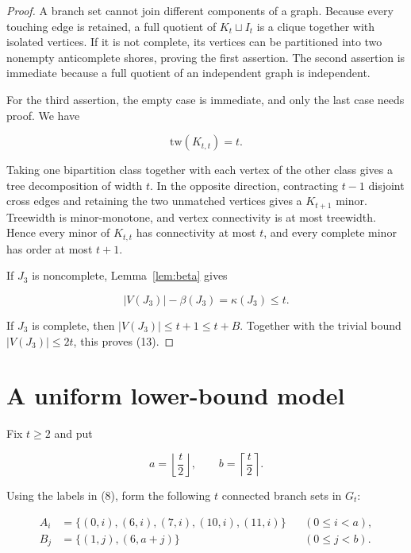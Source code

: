 \documentclass[11pt]{article}
\begin{document}
\begin{proof}

A branch set cannot join different components of a graph. Because every
touching edge is retained, a full quotient of $K_t\sqcup I_t$ is a clique
together with isolated vertices. If it is not complete, its vertices can be
partitioned into two nonempty anticomplete shores, proving the first assertion.
The second assertion is immediate because a full quotient of an independent
graph is independent.

For the third assertion, the empty case is immediate, and only the last case
needs proof. We have

\nopagebreak[4]
\[
\mathrm{tw}(K_{t,t})=t.                                    \tag{14}
\]

Taking one bipartition class together with each vertex of the other class
gives a tree decomposition of width $t$. In the opposite direction,
contracting $t-1$ disjoint cross edges and retaining the two unmatched
vertices gives a $K_{t+1}$ minor. Treewidth is minor-monotone, and vertex
connectivity is at most treewidth. Hence every minor of $K_{t,t}$ has
connectivity at most $t$, and every complete minor has order at most $t+1$.

If $J_3$ is noncomplete, Lemma~\ref{lem:beta} gives

\nopagebreak[4]
\[
|V(J_3)|-\beta(J_3)=\kappa(J_3)\leq t.
\]

If $J_3$ is complete, then $|V(J_3)|\leq t+1\leq t+B$.
Together with the trivial bound $|V(J_3)|\leq2t$, this proves (13).

\end{proof}


\section{A uniform lower-bound model}


Fix $t\geq2$ and put

\nopagebreak[4]
\[
a=\left\lfloor\frac t2\right\rfloor,
\qquad
b=\left\lceil\frac t2\right\rceil.                         \tag{15}
\]

Using the labels in (8), form the following $t$ connected branch sets in
$G_t$:

\nopagebreak[4]
\[
\begin{aligned}
A_i&=\{(0,i),(6,i),(7,i),(10,i),(11,i)\}
&& (0\leq i<a),\\
B_j&=\{(1,j),(6,a+j)\}
&& (0\leq j<b).
\end{aligned}                                                \tag{16}
\]
\end{document}
